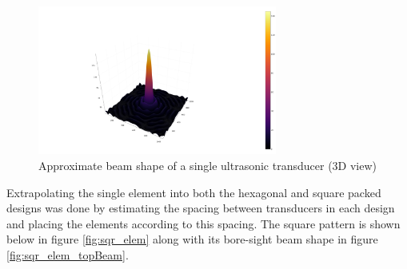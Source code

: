 \begin{figure}[ht!]
    \centering
    \includegraphics[width=0.7\textwidth]{Figures/arraySim/single/beampat3D.png}
    \caption{Approximate beam shape of a single ultrasonic transducer (3D view)}
    \label{fig:single_elem_3Dbeam}
\end{figure}
\newpage
Extrapolating the single element into both the hexagonal and square packed designs was done by estimating the spacing between transducers in each design and placing the elements according to this spacing. The square pattern is shown below in figure \ref{fig:sqr_elem} along with its bore-sight beam shape in figure \ref{fig:sqr_elem_topBeam}.

